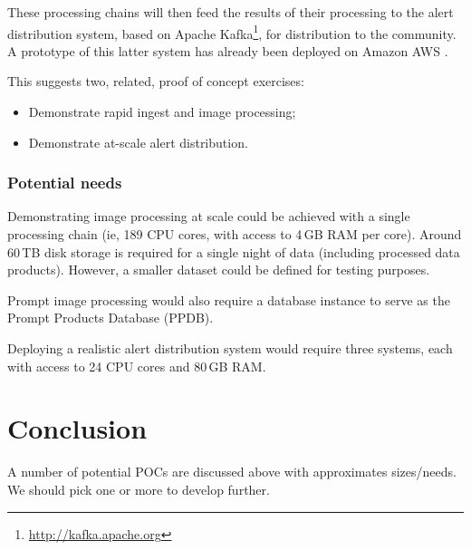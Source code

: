 These processing chains will then feed the results of their processing to the alert distribution system, based on Apache Kafka\footnote{\url{http://kafka.apache.org}}, for distribution to the community.
A prototype of this latter system has already been deployed on Amazon AWS .

This suggests two, related, proof of concept exercises:

\begin{itemize}

\item{Demonstrate rapid ingest and image processing;}
\item{Demonstrate at-scale alert distribution.}

\end{itemize}

\subsubsection{Potential needs}

Demonstrating image processing at scale could be achieved with a single processing chain (ie, 189 CPU cores, with access to 4\,GB RAM per core).
Around 60\,TB disk storage is required for a single night of data (including processed data products).
However, a smaller dataset could be defined for testing purposes.

Prompt image processing would also require a database instance to serve as the Prompt Products Database (PPDB).

Deploying a realistic alert distribution system would require three systems, each with access to 24 CPU cores and 80\,GB RAM.

\section{Conclusion}
A number of potential POCs are discussed above with approximates sizes/needs.
We should pick one or more to develop further.
